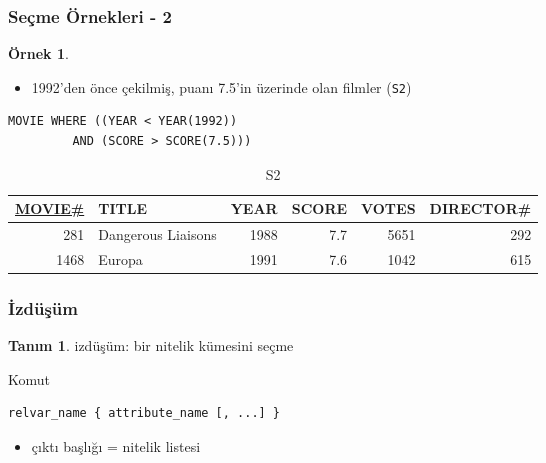 \documentclass[dvipsnames]{beamer}
\theoremstyle{definition}
\newtheorem{tanim}[theorem]{Tanım}
\theoremstyle{example}
\newtheorem{ornek}[theorem]{Örnek}
\theoremstyle{plain}
\begin{document}
\begin{frame}[fragile]
  \frametitle{Seçme Örnekleri - 2}

  \begin{ornek}
    \begin{itemize}
      \item 1992'den önce çekilmiş, puanı 7.5'in üzerinde olan filmler
        (\texttt{S2})
    \end{itemize}

    \begin{lstlisting}
MOVIE WHERE ((YEAR < YEAR(1992))
         AND (SCORE > SCORE(7.5)))
    \end{lstlisting}

    \pause
    \vspace{-10pt}
    \begin{tiny}
    \begin{table}
      \caption{S2}
      \begin{tabular}{|r|l|r|r|r|r|}\hline
\underline{MOVIE\#} & TITLE & YEAR & SCORE & VOTES & DIRECTOR\#\\[2pt]\hline\hline
   281 & Dangerous Liaisons & 1988 &   7.7 &  5651 &        292\\\hline
  1468 & Europa             & 1991 &   7.6 &  1042 &        615\\\hline
      \end{tabular}
    \end{table}
    \end{tiny}
  \end{ornek}
\end{frame}

\begin{frame}[fragile]
  \frametitle{İzdüşüm}

  \begin{tanim}
    \alert{izdüşüm}: bir nitelik kümesini seçme
  \end{tanim}

  \pause
  \begin{block}{Komut}
    \begin{lstlisting}
relvar_name { attribute_name [, ...] }
    \end{lstlisting}
  \end{block}

  \pause
  \begin{itemize}
    \item çıktı başlığı = nitelik listesi
  \end{itemize}
\end{frame}
\end{document}
